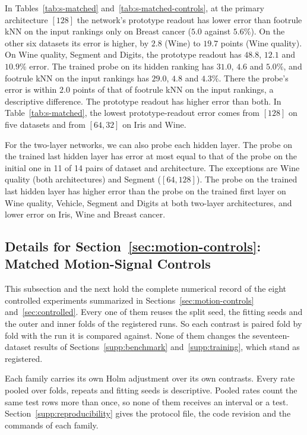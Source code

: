 


In Tables~\ref{tab:s-matched} and~\ref{tab:s-matched-controls}, at the primary architecture $[128]$ the network's prototype readout has lower error than footrule kNN on the input rankings only on Breast cancer ($5.0$ against $5.6\%$). On the other six datasets its error is higher, by $2.8$ (Wine) to $19.7$ points (Wine quality). On Wine quality, Segment and Digits, the prototype readout has $48.8$, $12.1$ and $10.9\%$ error. The trained probe on its hidden ranking has $31.0$, $4.6$ and $5.0\%$, and footrule kNN on the input rankings has $29.0$, $4.8$ and $4.3\%$. There the probe's error is within $2.0$ points of that of footrule kNN on the input rankings, a descriptive difference. The prototype readout has higher error than both. In Table~\ref{tab:s-matched}, the lowest prototype-readout error comes from $[128]$ on five datasets and from $[64,32]$ on Iris and Wine.

For the two-layer networks, we can also probe each hidden layer. The probe on the trained last hidden layer has error at most equal to that of the probe on the initial one in 11 of 14 pairs of dataset and architecture. The exceptions are Wine quality (both architectures) and Segment ($[64,128]$). The probe on the trained last hidden layer has higher error than the probe on the trained first layer on Wine quality, Vehicle, Segment and Digits at both two-layer architectures, and lower error on Iris, Wine and Breast cancer.




\clearpage
\subsection{Details for Section~\ref*{sec:motion-controls}: Matched Motion-Signal Controls}\label{supp:motion}

This subsection and the next hold the complete numerical record of the eight controlled experiments summarized in Sections~\ref{sec:motion-controls} and~\ref{sec:controlled}. Every one of them reuses the split seed, the fitting seeds and the outer and inner folds of the registered runs. So each contrast is paired fold by fold with the run it is compared against. None of them changes the seventeen-dataset results of Sections~\ref{supp:benchmark} and~\ref{supp:training}, which stand as registered.

Each family carries its own Holm adjustment over its own contrasts. Every rate pooled over folds, repeats and fitting seeds is descriptive. Pooled rates count the same test rows more than once, so none of them receives an interval or a test. Section~\ref{supp:reproducibility} gives the protocol file, the code revision and the commands of each family.

